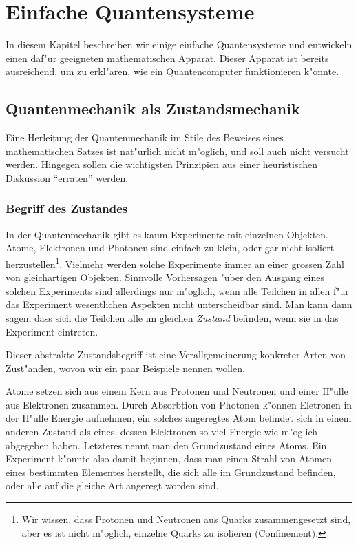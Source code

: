 \chapter{Einfache Quantensysteme\label{chapter:einfache-quantensysteme}}
\rhead{}
In diesem Kapitel beschreiben wir einige einfache Quantensysteme und
entwickeln einen daf"ur geeigneten mathematischen Apparat. Dieser
Apparat ist bereits ausreichend, um zu erkl"aren, wie ein Quantencomputer
funktionieren k"onnte.

\section{Quantenmechanik als Zustandsmechanik}
Eine Herleitung der Quantenmechanik im Stile des Beweises eines mathematischen
Satzes ist nat"ur\-lich nicht m"oglich, und soll auch nicht versucht werden.
Hingegen sollen die wichtigsten Prinzipien aus einer heuristischen
Diskussion ``erraten'' werden. 

\subsection{Begriff des Zustandes}
In der Quantenmechanik gibt es kaum Experimente mit einzelnen Objekten.
Atome, Elektronen und Photonen sind einfach zu klein, oder gar nicht
isoliert herzustellen\footnote{Wir wissen, dass Protonen und Neutronen aus
Quarks zusammengesetzt sind, aber es ist nicht m"oglich, einzelne Quarks
zu isolieren (Confinement).}.
Vielmehr werden solche Experimente immer
an einer grossen Zahl von gleichartigen Objekten.
Sinnvolle Vorhersagen "uber den Ausgang eines solchen Experiments
sind allerdings nur m"oglich, wenn alle
Teilchen in allen f"ur das Experiment wesentlichen Aspekten
nicht unterscheidbar sind. Man kann dann sagen, dass sich die
Teilchen alle im gleichen {\em Zustand}\/ befinden, wenn sie in
das Experiment eintreten.

Dieser abstrakte Zustandsbegriff ist eine Verallgemeinerung konkreter
Arten von Zust"anden, wovon wir ein paar Beispiele nennen wollen.

Atome setzen sich aus einem Kern aus Protonen und Neutronen und einer
H"ulle aus Elektronen zusammen.
Durch Absorbtion von Photonen k"onnen Eletronen in der H"ulle Energie
aufnehmen, ein solches angeregtes Atom befindet sich in einem anderen
Zustand als eines, dessen Elektronen so viel Energie wie m"oglich
abgegeben haben.
Letzteres nennt man den Grundzustand eines Atoms.
Ein Experiment k"onnte also damit beginnen,
dass man einen Strahl von Atomen eines bestimmten Elementes herstellt,
die sich alle im Grundzustand befinden, oder alle auf die gleiche Art
angeregt worden sind.


